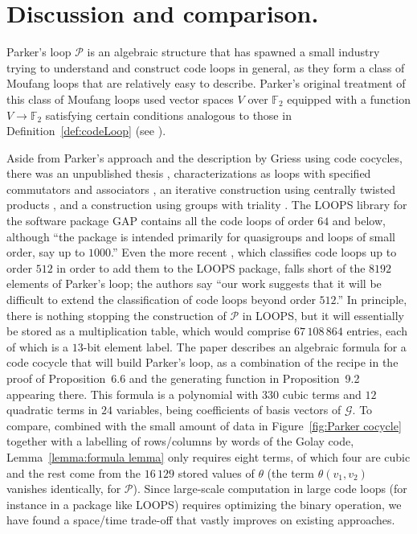 \documentclass{article}
\theoremstyle{plain}
\theoremstyle{definition}
\def \cG {\mathcal{G}}
\def \cP {\mathcal{P}}
\def \FF {\mathbb{F}}
\begin{document}
\section{Discussion and comparison.}\label{sec:discussion}

Parker's loop $\cP$ is an algebraic structure that has spawned a small industry trying to understand and construct code loops in general, as they form a class of Moufang loops that are relatively easy to describe.
Parker's original treatment of this class of Moufang loops used vector spaces $V$ over $\FF_2$ equipped with a function $V \to \FF_2$ satisfying certain conditions analogous to those in Definition~\ref{def:codeLoop} (see \cite[Definition~13]{Griess}).

Aside from Parker's approach and the description by Griess using code cocycles, there was an unpublished thesis \cite{Johnson}, characterizations as loops with specified commutators and associators \cite{CheinGoodaire}, an iterative construction using centrally twisted products \cite{Hsu}, and a construction using groups with triality \cite{Nagy}. 
The LOOPS library \cite{LOOPS} for the software package GAP \cite{GAP4} contains all the code loops of order $64$ and below, although ``the package is intended primarily for quasigroups and loops of small order, say up to $1000$.''
Even the more recent \cite{OBrien_Vojtechovsky}, which classifies code loops up to order $512$ in order to add them to the LOOPS package, falls short of the $8192$ elements of Parker's loop; the authors say ``our work suggests that it will be difficult to extend the classification of code loops beyond order $512$.''
In principle, there is nothing stopping the construction of $\cP$ in LOOPS, but it will essentially be stored as a multiplication table, which would comprise $67\,108\,864$ entries, each of which is a $13$-bit element label.
The paper \cite{Morier-Genoud_Ovsienko} describes an algebraic formula for a code cocycle that will build Parker's loop, as a combination of the recipe in the proof of Proposition~6.6 and the generating function in Proposition~9.2 appearing there.
This formula is a polynomial with $330$ cubic terms and $12$ quadratic terms in $24$ variables, being coefficients of basis vectors of $\cG$. 
To compare, combined with the small amount of data in Figure~\ref{fig:Parker cocycle} together with a labelling of rows/columns by words of the Golay code, Lemma~\ref{lemma:formula lemma} only requires eight terms, of which four are cubic and the rest come from the $16\,129$ stored values of $\theta$ (the term $\theta(v_1,v_2)$ vanishes identically, for $\cP$).
Since large-scale computation in large code loops (for instance in a package like LOOPS) requires optimizing the binary operation, we have found a space/time trade-off that vastly improves on existing approaches.
\end{document}
